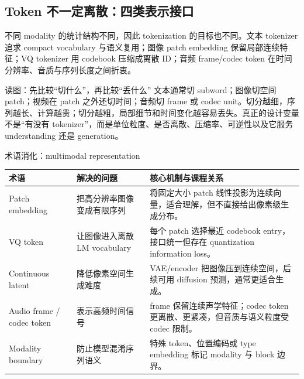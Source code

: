\subsection{Token 不一定离散：四类表示接口}

不同 modality 的统计结构不同，因此 tokenization 的目标也不同。文本 tokenizer 追求 compact vocabulary 与语义复用；图像 patch embedding 保留局部连续特征；VQ tokenizer 用 codebook 压缩成离散 ID；音频 frame/codec token 在时间分辨率、音质与序列长度之间折衷。


\begin{knowledgebox}{读图：先比较“切什么”，再比较“丢什么”}
文本通常切 subword；图像切空间 patch；视频在 patch 之外还切时间；音频切 frame 或 codec unit。切分越细，序列越长、计算越贵；切分越粗，局部细节和时间变化越容易丢失。真正的设计变量不是“有没有 tokenizer”，而是单位粒度、是否离散、压缩率、可逆性以及它服务 understanding 还是 generation。
\end{knowledgebox}


\begin{knowledgebox}{术语消化：multimodal representation}
\begin{longtable}{L{0.20\textwidth}L{0.27\textwidth}L{0.42\textwidth}}
\toprule
术语 & 解决的问题 & 核心机制与课程关系 \\
\midrule
Patch embedding & 把高分辨率图像变成有限序列 & 将固定大小 patch 线性投影为连续向量，适合理解，但不直接给出像素级生成分布。 \\
VQ token & 让图像进入离散 LM vocabulary & 每个 patch 选择最近 codebook entry，接口统一但存在 quantization information loss。 \\
Continuous latent & 降低像素空间生成难度 & VAE/encoder 把图像压到连续空间，后续可用 diffusion 预测，通常更适合生成。 \\
Audio frame / codec token & 表示高频时间信号 & frame 保留连续声学特征；codec token 更离散、更紧凑，但音质与语义粒度受 codec 限制。 \\
Modality boundary & 防止模型混淆序列语义 & 特殊 token、位置编码或 type embedding 标记 modality 与 block 边界。 \\
\bottomrule
\end{longtable}
\end{knowledgebox}

